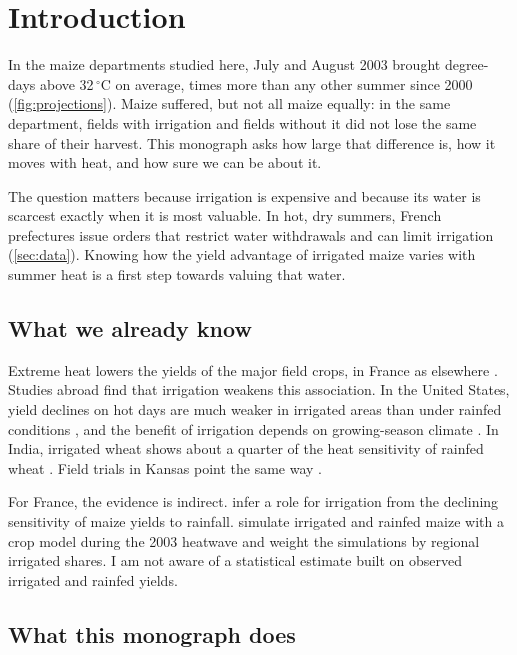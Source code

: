 \section{Introduction}
\label{sec:introduction}

In the maize departments studied here, July and August 2003 brought \HeatTwoThousandThree{} degree-days above 32\,$^{\circ}$C on average, \HeatRatio{} times more than any other summer since 2000 (\cref{fig:projections}). Maize suffered, but not all maize equally: in the same department, fields with irrigation and fields without it did not lose the same share of their harvest. This monograph asks how large that difference is, how it moves with heat, and how sure we can be about it.

The question matters because irrigation is expensive and because its water is scarcest exactly when it is most valuable. In hot, dry summers, French prefectures issue orders that restrict water withdrawals and can limit irrigation (\cref{sec:data}). Knowing how the yield advantage of irrigated maize varies with summer heat is a first step towards valuing that water.

\subsection*{What we already know}

Extreme heat lowers the yields of the major field crops, in France as elsewhere \parencite{schlenker2009,gammans2017}. Studies abroad find that irrigation weakens this association. In the United States, yield declines on hot days are much weaker in irrigated areas than under rainfed conditions \parencite{schauberger2017}, and the benefit of irrigation depends on growing-season climate \parencite{li2018}. In India, irrigated wheat shows about a quarter of the heat sensitivity of rainfed wheat \parencite{zaveri2019}. Field trials in Kansas point the same way \parencite{tack2017}.

For France, the evidence is indirect. \textcite{hawkins2013} infer a role for irrigation from the declining sensitivity of maize yields to rainfall. \textcite{vandervelde2010} simulate irrigated and rainfed maize with a crop model during the 2003 heatwave and weight the simulations by regional irrigated shares. I am not aware of a statistical estimate built on observed irrigated and rainfed yields.

\subsection*{What this monograph does}


